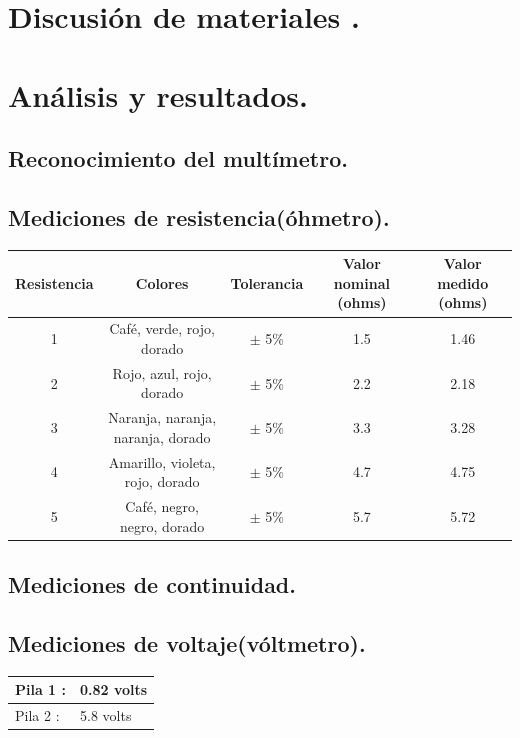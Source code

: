 \documentclass[10pt]{article}
\begin{document}
\begin{multicols}{2}
\section{Discusión de materiales .}


\section{Análisis y resultados.}

\subsection{Reconocimiento del multímetro.}
 

\subsection{Mediciones de resistencia(óhmetro).}

\begin{adjustbox}{width=\textwidth}
	\begin{tabular}{|c|c|c|c|c|}
		\hline
		Resistencia & Colores & Tolerancia & Valor nominal (ohms) & Valor medido (ohms) \\
		\hline
		1 & Café, verde, rojo, dorado & $\pm$ 5\% & 1.5 & 1.46 \\
		\hline
		2 & Rojo, azul, rojo, dorado & $\pm$ 5\% & 2.2 & 2.18 \\
		\hline
		3 & Naranja, naranja, naranja, dorado & $\pm$ 5\% & 3.3 & 3.28 \\
		\hline
		4 & Amarillo, violeta, rojo, dorado & $\pm$ 5\% & 4.7 & 4.75 \\
		\hline
		5 & Café, negro, negro, dorado & $\pm$ 5\% & 5.7 & 5.72 \\
		\hline
	\end{tabular}
\end{adjustbox}

\subsection{Mediciones de continuidad.}

\subsection{Mediciones de voltaje(vóltmetro).}
\begin{tabular}{ p{4cm} p{3cm} }
	\hline
	Pila 1 : & 0.82 volts \\
	\hline
	Pila 2 : & 5.8 volts \\
	\hline
\end{tabular}


\end{multicols}
\end{document}
